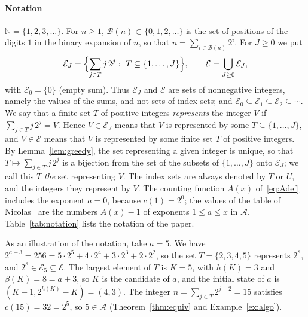 \documentclass[11pt]{amsart}
\theoremstyle{definition}
\begin{document}
\paragraph{Notation} $\mathbb{N}=\{1,2,3,\dots\}$. For $n\ge1$, $\mathcal{B}(n)\subset\{0,1,2,\dots\}$ is the set of positions of the digits $1$ in the binary expansion of $n$, so that $n=\sum_{i\in\mathcal{B}(n)}2^i$. For $J\ge0$ we put
\begin{equation}
\label{eq:EJ}
\mathcal{E}_J=\Bigl\{\sum_{j\in T}j\,2^{j}:\ T\subseteq\{1,\dots,J\}\Bigr\},\qquad \mathcal{E}=\bigcup_{J\ge0}\mathcal{E}_J,
\end{equation}
with $\mathcal{E}_0=\{0\}$ (empty sum). Thus $\mathcal{E}_J$ and $\mathcal{E}$ are sets of nonnegative integers, namely the values of the sums, and not sets of index sets; and $\mathcal{E}_0\subseteq\mathcal{E}_1\subseteq\mathcal{E}_2\subseteq\cdots$. We say that a finite set $T$ of positive integers \emph{represents} the integer $V$ if $\sum_{j\in T}j\,2^{j}=V$. Hence $V\in\mathcal{E}_J$ means that $V$ is represented by some $T\subseteq\{1,\dots,J\}$, and $V\in\mathcal{E}$ means that $V$ is represented by some finite set $T$ of positive integers. By Lemma~\ref{lem:greedy}, the set representing a given integer is unique, so that $T\mapsto\sum_{j\in T}j\,2^{j}$ is a bijection from the set of the subsets of $\{1,\dots,J\}$ onto $\mathcal{E}_J$; we call this $T$ \emph{the} set representing $V$. The index sets are always denoted by $T$ or $U$, and the integers they represent by $V$. The counting function $A(x)$ of~\eqref{eq:Adef} includes the exponent $a=0$, because $c(1)=2^0$; the values of the table of Nicolas~\cite{nicolas2005open} are the numbers $A(x)-1$ of exponents $1\le a\le x$ in $\mathcal{A}$. Table~\ref{tab:notation} lists the notation of the paper.

As an illustration of the notation, take $a=5$. We have $2^{a+3}=256=5\cdot2^5+4\cdot2^4+3\cdot2^3+2\cdot2^2$, so the set $T=\{2,3,4,5\}$ represents $2^8$, and $2^8\in\mathcal{E}_5\subseteq\mathcal{E}$. The largest element of $T$ is $K=5$, with $h(K)=3$ and $\beta(K)=8=a+3$, so $K$ is the candidate of $a$, and the initial state of $a$ is $(K-1,2^{h(K)}-K)=(4,3)$. The integer $n=\sum_{j\in T}2^{j-2}=15$ satisfies $c(15)=32=2^5$, so $5\in\mathcal{A}$ (Theorem~\ref{thm:equiv} and Example~\ref{ex:algo}).
\end{document}
